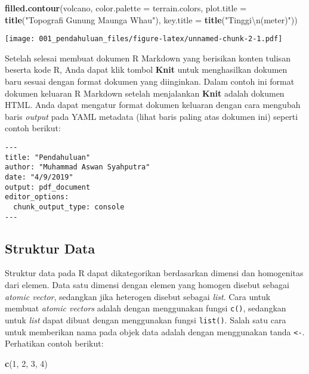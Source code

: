 \documentclass[]{article}
\newenvironment{Shaded}{\begin{snugshade}}{\end{snugshade}}
\newcommand{\KeywordTok}[1]{\textcolor[rgb]{0.13,0.29,0.53}{\textbf{#1}}}
\newcommand{\DataTypeTok}[1]{\textcolor[rgb]{0.13,0.29,0.53}{#1}}
\newcommand{\DecValTok}[1]{\textcolor[rgb]{0.00,0.00,0.81}{#1}}
\newcommand{\CharTok}[1]{\textcolor[rgb]{0.31,0.60,0.02}{#1}}
\newcommand{\StringTok}[1]{\textcolor[rgb]{0.31,0.60,0.02}{#1}}
\newcommand{\NormalTok}[1]{#1}
\begin{document}
\begin{Shaded}
\begin{Highlighting}[]
\KeywordTok{filled.contour}\NormalTok{(volcano,}
               \DataTypeTok{color.palette =}\NormalTok{ terrain.colors, }
               \DataTypeTok{plot.title =} \KeywordTok{title}\NormalTok{(}\StringTok{"Topografi Gunung Maunga Whau"}\NormalTok{), }
               \DataTypeTok{key.title =} \KeywordTok{title}\NormalTok{(}\StringTok{"Tinggi}\CharTok{\textbackslash{}n}\StringTok{(meter)"}\NormalTok{))}
\end{Highlighting}
\end{Shaded}

\texttt{[image: 001\_pendahuluan\_files/figure-latex/unnamed-chunk-2-1.pdf]}

Setelah selesai membuat dokumen R Markdown yang berisikan konten tulisan
beserta kode R, Anda dapat klik tombol \textbf{Knit} untuk menghasilkan
dokumen baru sesuai dengan format dokumen yang diinginkan. Dalam contoh
ini format dokumen keluaran R Markdown setelah menjalankan \textbf{Knit}
adalah dokumen HTML. Anda dapat mengatur format dokumen keluaran dengan
cara mengubah baris \emph{output} pada YAML metadata (lihat baris paling
atas dokumen ini) seperti contoh berikut:

\begin{verbatim}
---
title: "Pendahuluan"
author: "Muhammad Aswan Syahputra"
date: "4/9/2019"
output: pdf_document
editor_options: 
  chunk_output_type: console
---
\end{verbatim}

\subsection{Struktur Data}\label{struktur-data}

Struktur data pada R dapat dikategorikan berdasarkan dimensi dan
homogenitas dari elemen. Data satu dimensi dengan elemen yang homogen
disebut sebagai \emph{atomic vector}, sedangkan jika heterogen disebut
sebagai \emph{list}. Cara untuk membuat \emph{atomic vectors} adalah
dengan menggunakan fungsi \texttt{c()}, sedangkan untuk \emph{list}
dapat dibuat dengan menggunakan fungsi \texttt{list()}. Salah satu cara
untuk memberikan nama pada objek data adalah dengan menggunakan tanda
\texttt{\textless{}-}. Perhatikan contoh berikut:

\begin{Shaded}
\begin{Highlighting}[]
\KeywordTok{c}\NormalTok{(}\DecValTok{1}\NormalTok{, }\DecValTok{2}\NormalTok{, }\DecValTok{3}\NormalTok{, }\DecValTok{4}\NormalTok{)}
\end{Highlighting}
\end{Shaded}
\end{document}
